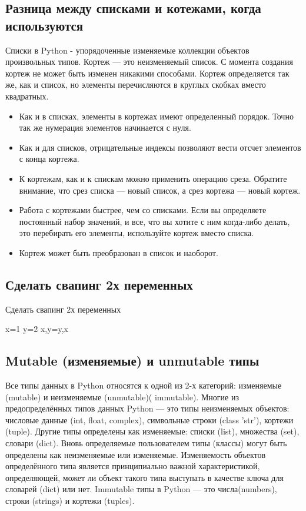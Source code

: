 \subsection{Разница между списками и котежами, когда используются}

	Списки в Python - упорядоченные изменяемые коллекции объектов произвольных типов.
Кортеж — это неизменяемый список. С момента создания кортеж не может быть изменен никакими способами.  Кортеж определяется так же, как и список, но элементы перечисляются в круглых скобках вместо квадратных.
	\begin{itemize}
\item	Как и в списках, элементы в кортежах имеют определенный порядок. Точно так же нумерация элементов начинается с нуля.
\item	Как и для списков, отрицательные индексы позволяют вести отсчет элементов с конца кортежа.
\item	К кортежам, как и к спискам можно применить операцию среза. Обратите внимание, что срез списка — новый список, а срез кортежа — новый кортеж.
\item	Работа с кортежами быстрее, чем со списками. Если вы определяете постоянный набор значений, и все, что вы хотите с ним когда-либо делать, это перебирать его элементы, используйте кортеж вместо списка.
\item	Кортеж может быть преобразован в список и наоборот.
	\end{itemize}

\subsection{Сделать свапинг 2х переменных}

Сделать свапинг 2х переменных
	\begin{python}
		x=1
		y=2
		x,y=y,x
	\end{python}

\subsection{Mutable (изменяемые) и unmutable типы}

Все типы данных в Python относятся к одной из 2-х категорий: изменяемые (mutable) и неизменяемые (unmutable)( immutable). Многие из предопределённых типов данных Python — это типы неизменяемых объектов: числовые данные (int, float, complex), символьные строки (class 'str'), кортежи (tuple). Другие типы определены как изменяемые: списки (list), множества (set), словари (dict). Вновь определяемые пользователем типы (классы) могут быть определены как неизменяемые или изменяемые. Изменяемость объектов определённого типа является принципиально важной характеристикой, определяющей, может ли объект такого типа выступать в качестве ключа для словарей (dict) или нет.
Immutable типы в Python — это числа(numbers), строки (strings) и кортежи (tuples).

